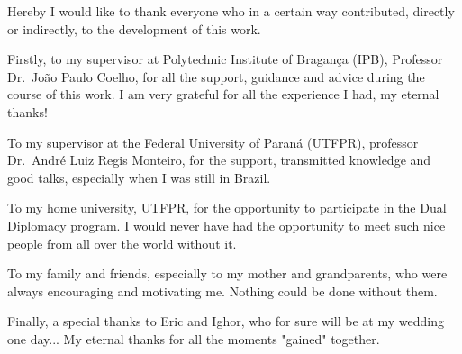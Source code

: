 

Hereby I would like to thank everyone who in a certain way contributed, directly or indirectly, to the development of this work.

Firstly, to my supervisor at Polytechnic Institute of Bragança (IPB), Professor Dr.~João Paulo Coelho, for all the support, guidance and advice during the course of this work. I am very grateful for all the experience I had, my eternal thanks!

To my supervisor at the Federal University of Paraná (UTFPR), professor Dr.~André Luiz Regis Monteiro, for the support, transmitted knowledge and good talks, especially when I was still in Brazil.

To my home university, UTFPR, for the opportunity to participate in the Dual Diplomacy program. I would never have had the opportunity to meet such nice people from all over the world without it. 

To my family and friends, especially to my mother and grandparents, who were always encouraging and motivating me. Nothing could be done without them.

Finally, a special thanks to Eric and Ighor, who for sure will be at my wedding one day... My eternal thanks for all the moments "gained" together.


